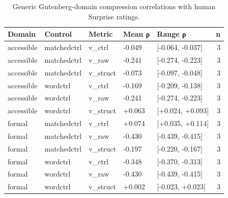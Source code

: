 \begin{table}
\caption{Generic Gutenberg-domain compression correlations with human Surprise ratings.}
\label{tab:table_3_generic_d_summary}
\begin{tabular}{lllllr}
\toprule
Domain & Control & Metric & Mean ρ & Range ρ & n \\
\midrule
accessible & matchedctrl & v\_ctrl & -0.049 & [-0.064, -0.037] & 3 \\
accessible & matchedctrl & v\_raw & -0.241 & [-0.274, -0.223] & 3 \\
accessible & matchedctrl & v\_struct & -0.073 & [-0.097, -0.048] & 3 \\
accessible & wordctrl & v\_ctrl & -0.169 & [-0.209, -0.138] & 3 \\
accessible & wordctrl & v\_raw & -0.241 & [-0.274, -0.223] & 3 \\
accessible & wordctrl & v\_struct & +0.063 & [+0.024, +0.093] & 3 \\
formal & matchedctrl & v\_ctrl & +0.074 & [+0.035, +0.114] & 3 \\
formal & matchedctrl & v\_raw & -0.430 & [-0.439, -0.415] & 3 \\
formal & matchedctrl & v\_struct & -0.197 & [-0.220, -0.167] & 3 \\
formal & wordctrl & v\_ctrl & -0.348 & [-0.370, -0.313] & 3 \\
formal & wordctrl & v\_raw & -0.430 & [-0.439, -0.415] & 3 \\
formal & wordctrl & v\_struct & +0.002 & [-0.023, +0.023] & 3 \\
\bottomrule
\end{tabular}
\end{table}
